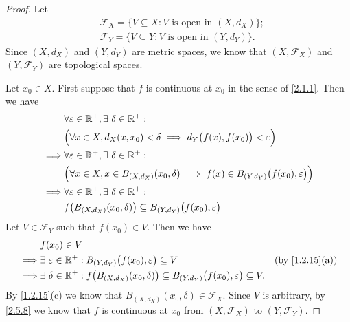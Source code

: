 \begin{proof}
  Let
  \begin{align*}
     & \mathcal{F}_X = \{V \subseteq X : V \text{ is open in } (X, d_X)\}; \\
     & \mathcal{F}_Y = \{V \subseteq Y : V \text{ is open in } (Y, d_Y)\}.
  \end{align*}
  Since \((X, d_X)\) and \((Y, d_Y)\) are metric spaces, we know that \((X, \mathcal{F}_X)\) and \((Y, \mathcal{F}_Y)\) are topological spaces.

  Let \(x_0 \in X\).
  First suppose that \(f\) is continuous at \(x_0\) in the sense of \cref{2.1.1}.
  Then we have
  \begin{align*}
             & \forall \varepsilon \in \mathbb{R}^+, \exists\ \delta \in \mathbb{R}^+ :                                                               \\
             & \Big(\forall x \in X, d_X(x, x_0) < \delta \implies d_Y\big(f(x), f(x_0)\big) < \varepsilon\Big)                       \\
    \implies & \forall \varepsilon \in \mathbb{R}^+, \exists\ \delta \in \mathbb{R}^+ :                                                               \\
             & \Big(\forall x \in X, x \in B_{(X, d_X)}(x_0, \delta) \implies f(x) \in B_{(Y, d_Y)}\big(f(x_0), \varepsilon\big)\Big) \\
    \implies & \forall \varepsilon \in \mathbb{R}^+, \exists\ \delta \in \mathbb{R}^+ :                                                               \\
             & f\big(B_{(X, d_X)}(x_0, \delta)\big) \subseteq B_{(Y, d_Y)}\big(f(x_0), \varepsilon\big)
  \end{align*}
  Let \(V \in \mathcal{F}_Y\) such that \(f(x_0) \in V\).
  Then we have
  \begin{align*}
             & f(x_0) \in V                                                                                                                                                    \\
    \implies & \exists\ \varepsilon \in \R^+ : B_{(Y, d_Y)}\big(f(x_0), \varepsilon\big) \subseteq V                                            & \text{(by \cref{1.2.15}(a))} \\
    \implies & \exists\ \delta \in \R^+ : f\big(B_{(X, d_X)}(x_0, \delta)\big) \subseteq B_{(Y, d_Y)}\big(f(x_0), \varepsilon\big) \subseteq V.
  \end{align*}
  By \cref{1.2.15}(c) we know that \(B_{(X, d_X)}(x_0, \delta) \in \mathcal{F}_X\).
  Since \(V\) is arbitrary, by \cref{2.5.8} we know that \(f\) is continuous at \(x_0\) from \((X, \mathcal{F}_X)\) to \((Y, \mathcal{F}_Y)\).


\end{proof}
